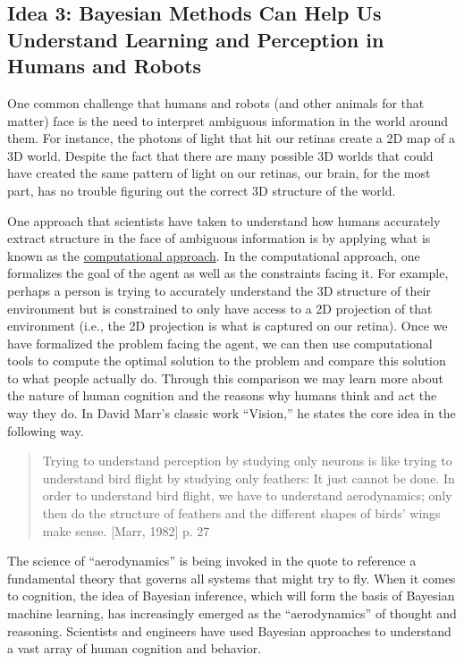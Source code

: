 \documentclass[assignment01_Solutions]{subfiles}
\begin{document}
\subsection*{Idea 3: Bayesian Methods Can Help Us Understand Learning and Perception in Humans and Robots}

One common challenge that humans and robots (and other animals for that matter) face is the need to interpret ambiguous information in the world around them.  For instance, the photons of light that hit our retinas create a 2D map of a 3D world.  Despite the fact that there are many possible 3D worlds that could have created the same pattern of light on our retinas, our brain, for the most part, has no trouble figuring out the correct 3D structure of the world.

One approach that scientists have taken to understand how humans accurately extract structure in the face of ambiguous information is by applying what is known as the \href{https://www.cse.huji.ac.il/~yweiss/intro/node2.html}{computational approach}.  In the computational approach, one formalizes the goal of the agent as well as the constraints facing it.  For example, perhaps a person is trying to accurately understand the 3D structure of their environment but is constrained to only have access to a 2D projection of that environment (i.e., the 2D projection is what is captured on our retina).  Once we have formalized the problem facing the agent, we can then use computational tools to compute the optimal solution to the problem and compare this solution to what people actually do.  Through this comparison we may learn more about the nature of human cognition and the reasons why humans think and act the way they do.  In David Marr's classic work ``Vision,'' he states the core idea in the following way.

\begin{quote}
Trying to understand perception by studying only neurons is like trying to understand bird flight by studying only feathers: It just cannot be done. In order to understand bird flight, we have to understand aerodynamics; only then do the structure of feathers and the different shapes of birds' wings make sense. [Marr, 1982] p. 27
 \end{quote}

The science of ``aerodynamics'' is being invoked in the quote to reference a fundamental theory that governs all systems that might try to fly.  When it comes to cognition, the idea of Bayesian inference, which will form the basis of Bayesian machine learning, has increasingly emerged as the ``aerodynamics'' of thought and reasoning.  Scientists and engineers have used Bayesian approaches to understand a vast array of human cognition and behavior.
\end{document}
